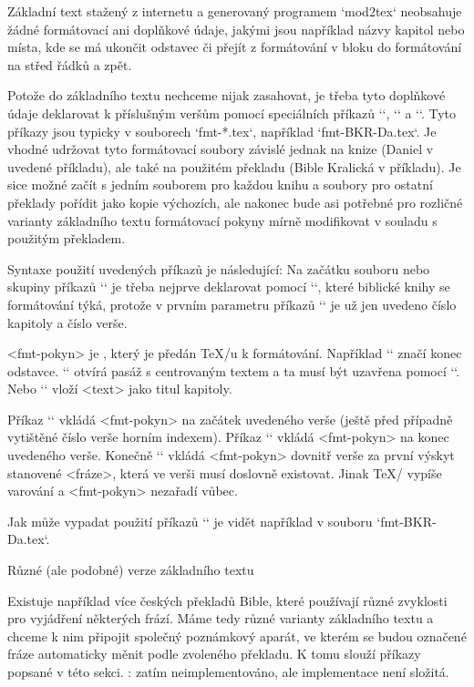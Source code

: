 Základní text stažený z internetu a generovaný programem `mod2tex` neobsahuje
žádné formátovací ani doplňkové údaje, jakými jsou například názvy kapitol
nebo místa, kde se má ukončit odstavec či přejít z formátování v bloku do
formátování na střed řádků a zpět.

Potože do základního textu nechceme nijak zasahovat, je třeba tyto doplňkové
údaje deklarovat k příslušným veršům pomocí speciálních příkazů `\fmtadd`,
`\fmtpre` a `\fmtins`. Tyto příkazy jsou typicky v souborech `fmt-*.tex`,
například `fmt-BKR-Da.tex`. Je vhodné udržovat tyto formátovací soubory
závislé jednak na knize (Daniel v uvedené příkladu), ale také na použitém
překladu (Bible Kralická v příkladu). Je sice možné začít s jedním souborem
pro každou knihu a soubory pro ostatní překlady pořídit jako kopie výchozích,
ale nakonec bude asi potřebné pro rozličné varianty základního textu
formátovací pokyny mírně modifikovat v souladu s použitým překladem.

Syntaxe použití uvedených příkazů je následující:
\begtt
{}
\endtt
Na začátku souboru nebo skupiny
příkazů `\fmt*` je třeba nejprve deklarovat pomocí `\FormatedBook`, které
biblické knihy se formátování týká, protože v prvním parametru příkazů `\fmt*` je už
jen uvedeno číslo kapitoly a číslo verše. 

<fmt-pokyn> je , který je předán \TeX/u k formátování.
Například `\endgraf` značí konec odstavce. `\begcenter` otvírá pasáž s
centrovaným textem a ta musí být uzavřena pomocí `\endcenter`. Nebo 
`` vloží <text> jako titul kapitoly.

Příkaz `\fmtpre` vkládá <fmt-pokyn>
na začátek uvedeného verše (ještě před případně vytištěné číslo verše horním
indexem). Příkaz `\fmtadd` vkládá <fmt-pokyn> na konec uvedeného verše.
Konečně `\fmtins` vkládá <fmt-pokyn> dovnitř verše za první výskyt stanovené
<fráze>, která ve verši musí doslovně existovat. Jinak \TeX/ vypíše varování
a <fmt-pokyn> nezařadí vůbec.

Jak může vypadat použití příkazů `\fmt*` je vidět například v souboru
`fmt-BKR-Da.tex`.


 Různé (ale podobné) verze základního textu

Existuje například více českých překladů Bible, které používají různé zvyklosti pro
vyjádření některých frází. Máme tedy různé varianty základního textu a
chceme k nim připojit společný poznámkový aparát, ve kterém se budou
označené fráze automaticky měnit podle zvoleného překladu. K tomu slouží příkazy
popsané v této sekci.
\TODO: zatím neimplementováno, ale implementace není složitá.


